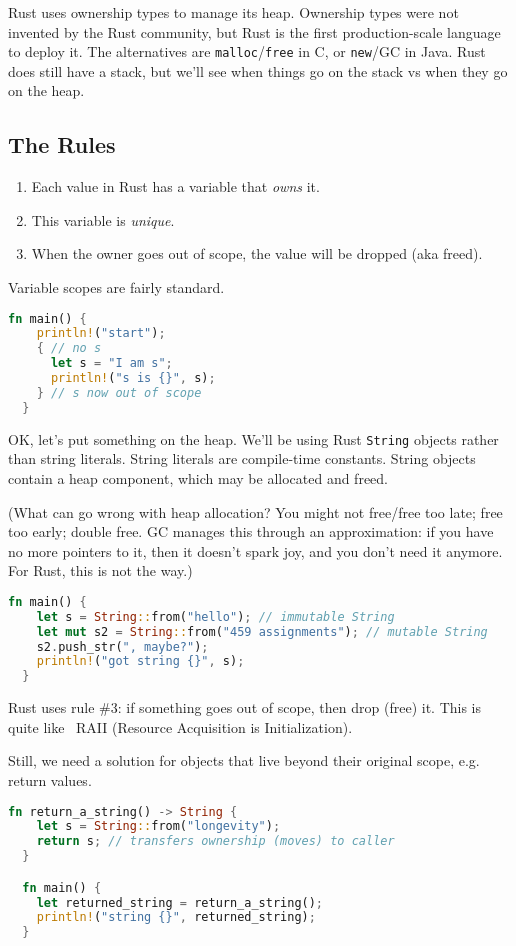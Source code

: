 Rust uses ownership types to manage its heap. Ownership types were not invented by the Rust
community, but Rust is the first production-scale language to deploy it. The alternatives
are {\tt malloc}/{\tt free} in C, or {\tt new}/GC in Java. Rust does still have a stack, but
we'll see when things go on the stack vs when they go on the heap.

\subsection*{The Rules}
\begin{enumerate}[noitemsep]
\item Each value in Rust has a variable that \emph{owns} it.
\item This variable is \emph{unique}.
\item When the owner goes out of scope, the value will be dropped (aka freed).
\end{enumerate}

Variable scopes are fairly standard.
\begin{lstlisting}[language=Rust]
  fn main() {
    println!("start");
    { // no s
      let s = "I am s";
      println!("s is {}", s);
    } // s now out of scope
  }
\end{lstlisting}

OK, let's put something on the heap. We'll be using Rust {\tt String} objects rather than
string literals. String literals are compile-time constants. String objects contain a heap component,
which may be allocated and freed.

(What can go wrong with heap allocation? You might not free/free too late;
free too early; double free. GC manages this through an approximation: if you have no more pointers to it,
then it doesn't spark joy, and you don't need it anymore. For Rust, this is not the way.)
\begin{lstlisting}[language=Rust]
  fn main() {
    let s = String::from("hello"); // immutable String
    let mut s2 = String::from("459 assignments"); // mutable String
    s2.push_str(", maybe?");
    println!("got string {}", s);
  }
\end{lstlisting}

Rust uses rule \#3: if something goes out of scope, then drop (free) it.
This is quite like \CPP~RAII (Resource Acquisition is Initialization).

Still, we need a solution for objects that live beyond their original scope, e.g.
return values.
\begin{lstlisting}[language=Rust]
  fn return_a_string() -> String {
    let s = String::from("longevity");
    return s; // transfers ownership (moves) to caller
  }

  fn main() {
    let returned_string = return_a_string();
    println!("string {}", returned_string);
  }
\end{lstlisting}

